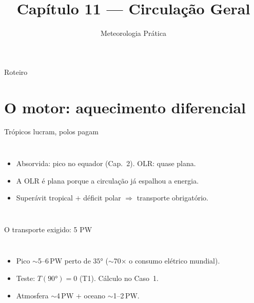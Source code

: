 \documentclass[aspectratio=169,11pt]{beamer}
\title[Cap. 11 --- Circulação Geral]{Capítulo 11 --- Circulação Geral}
\subtitle{Meteorologia Prática}
\author{}
\date{}
\begin{document}
\begin{frame}
  \titlepage
  \vfill
  \atribuicao
\end{frame}

\begin{frame}{Roteiro}
  \tableofcontents
\end{frame}

\section{O motor: aquecimento diferencial}

\begin{frame}{Trópicos lucram, polos pagam}
  \begin{columns}
    \begin{itemize}
      \item Absorvida: pico no equador (Cap.~2). OLR: quase plana.
      \item A OLR é plana \alert{porque} a circulação já espalhou a
            energia.
      \item Superávit tropical $+$ déficit polar $\Rightarrow$
            transporte obrigatório.
    \end{itemize}
  \end{columns}
\end{frame}

\begin{frame}{O transporte exigido: 5 PW}
  \begin{columns}
    \vspace{0.4em}
    \begin{itemize}
      \item Pico $\sim$5--6\,PW perto de $35°$ ($\sim$70$\times$ o
            consumo elétrico mundial).
      \item Teste: $T(90°) = 0$ (T1). Cálculo no Caso~1.
      \item Atmosfera $\sim$4\,PW $+$ oceano $\sim$1--2\,PW.
    \end{itemize}
  \end{columns}
\end{frame}
\end{document}
